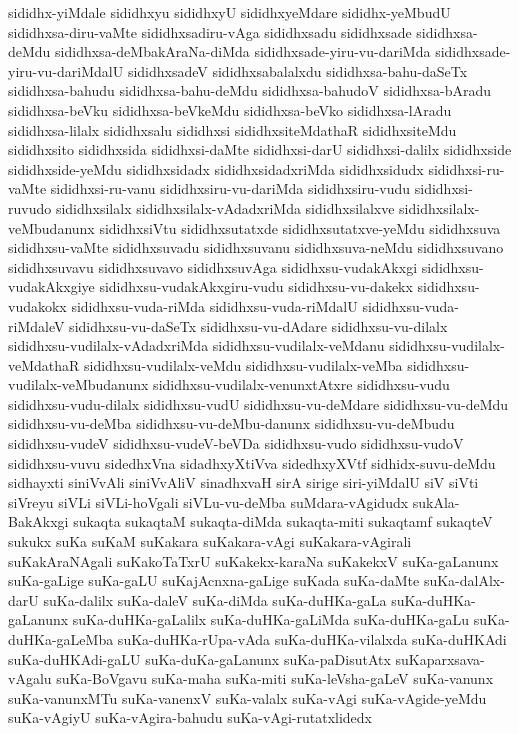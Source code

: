 {sididhx-yiMdale
sididhxyu
sididhxyU
sididhxyeMdare
sididhx-yeMbudU
sididhxsa-diru-vaMte
sididhxsadiru-vAga
sididhxsadu
sididhxsade
sididhxsa-deMdu
sididhxsa-deMbakAraNa-diMda
sididhxsade-yiru-vu-dariMda
sididhxsade-yiru-vu-dariMdalU
sididhxsadeV
sididhxsabalalxdu
sididhxsa-bahu-daSeTx
sididhxsa-bahudu
sididhxsa-bahu-deMdu
sididhxsa-bahudoV
sididhxsa-bAradu
sididhxsa-beVku
sididhxsa-beVkeMdu
sididhxsa-beVko
sididhxsa-lAradu
sididhxsa-lilalx
sididhxsalu
sididhxsi
sididhxsiteMdathaR
sididhxsiteMdu
sididhxsito
sididhxsida
sididhxsi-daMte
sididhxsi-darU
sididhxsi-dalilx
sididhxside
sididhxside-yeMdu
sididhxsidadx
sididhxsidadxriMda
sididhxsidudx
sididhxsi-ru-vaMte
sididhxsi-ru-vanu
sididhxsiru-vu-dariMda
sididhxsiru-vudu
sididhxsi-ruvudo
sididhxsilalx
sididhxsilalx-vAdadxriMda
sididhxsilalxve
sididhxsilalx-veMbudanunx
sididhxsiVtu
sididhxsutatxde
sididhxsutatxve-yeMdu
sididhxsuva
sididhxsu-vaMte
sididhxsuvadu
sididhxsuvanu
sididhxsuva-neMdu
sididhxsuvano
sididhxsuvavu
sididhxsuvavo
sididhxsuvAga
sididhxsu-vudakAkxgi
sididhxsu-vudakAkxgiye
sididhxsu-vudakAkxgiru-vudu
sididhxsu-vu-dakekx
sididhxsu-vudakokx
sididhxsu-vuda-riMda
sididhxsu-vuda-riMdalU
sididhxsu-vuda-riMdaleV
sididhxsu-vu-daSeTx
sididhxsu-vu-dAdare
sididhxsu-vu-dilalx
sididhxsu-vudilalx-vAdadxriMda
sididhxsu-vudilalx-veMdanu
sididhxsu-vudilalx-veMdathaR
sididhxsu-vudilalx-veMdu
sididhxsu-vudilalx-veMba
sididhxsu-vudilalx-veMbudanunx
sididhxsu-vudilalx-venunxtAtxre
sididhxsu-vudu
sididhxsu-vudu-dilalx
sididhxsu-vudU
sididhxsu-vu-deMdare
sididhxsu-vu-deMdu
sididhxsu-vu-deMba
sididhxsu-vu-deMbu-danunx
sididhxsu-vu-deMbudu
sididhxsu-vudeV
sididhxsu-vudeV-beVDa
sididhxsu-vudo
sididhxsu-vudoV
sididhxsu-vuvu
sidedhxVna
sidadhxyXtiVva
sidedhxyXVtf
sidhidx-suvu-deMdu
sidhayxti
siniVvAli
siniVvAliV
sinadhxvaH
sirA
sirige
siri-yiMdalU
siV
siVti
siVreyu
siVLi
siVLi-hoVgali
siVLu-vu-deMba
suMdara-vAgidudx
sukAla-BakAkxgi
sukaqta
sukaqtaM
sukaqta-diMda
sukaqta-miti
sukaqtamf
sukaqteV
sukukx
suKa
suKaM
suKakara
suKakara-vAgi
suKakara-vAgirali
suKakAraNAgali
suKakoTaTxrU
suKakekx-karaNa
suKakekxV
suKa-gaLanunx
suKa-gaLige
suKa-gaLU
suKajAcnxna-gaLige
suKada
suKa-daMte
suKa-dalAlx-darU
suKa-dalilx
suKa-daleV
suKa-diMda
suKa-duHKa-gaLa
suKa-duHKa-gaLanunx
suKa-duHKa-gaLalilx
suKa-duHKa-gaLiMda
suKa-duHKa-gaLu
suKa-duHKa-gaLeMba
suKa-duHKa-rUpa-vAda
suKa-duHKa-vilalxda
suKa-duHKAdi
suKa-duHKAdi-gaLU
suKa-duKa-gaLanunx
suKa-paDisutAtx
suKaparxsava-vAgalu
suKa-BoVgavu
suKa-maha
suKa-miti
suKa-leVsha-gaLeV
suKa-vanunx
suKa-vanunxMTu
suKa-vanenxV
suKa-valalx
suKa-vAgi
suKa-vAgide-yeMdu
suKa-vAgiyU
suKa-vAgira-bahudu
suKa-vAgi-rutatxlidedx
}
